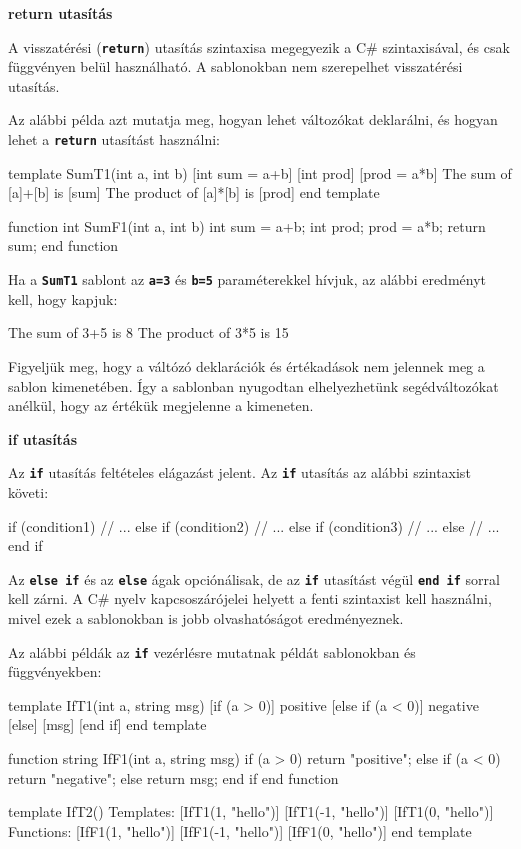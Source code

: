 \documentclass[12pt, a4paper]{report}
\newcommand{\ff}[1]{\textbf{\texttt{#1}}}
\newcommand{\bb}[1]{\textbf{#1}}
\begin{document}
\bb{return utasítás}

A visszatérési (\ff{return}) utasítás szintaxisa megegyezik a C\# szintaxisával, és csak függvényen belül használható. A sablonokban nem szerepelhet visszatérési utasítás.

Az alábbi példa azt mutatja meg, hogyan lehet változókat deklarálni, és hogyan lehet a \ff{return} utasítást használni:

\begin{mgencode}
template SumT1(int a, int b)
  [int sum = a+b]
  [int prod]
  [prod = a*b]
  The sum of [a]+[b] is [sum]
  The product of [a]*[b] is [prod]
end template

function int SumF1(int a, int b)
  int sum = a+b;
  int prod;
  prod = a*b;
  return sum;
end function
\end{mgencode}

Ha a \ff{SumT1} sablont az \ff{a=3} és \ff{b=5} paraméterekkel hívjuk, az alábbi eredményt kell, hogy kapjuk:

\begin{textcode}
  The sum of 3+5 is 8
  The product of 3*5 is 15
\end{textcode}

Figyeljük meg, hogy a váltózó deklarációk és értékadások nem jelennek meg a sablon kimenetében. Így a sablonban nyugodtan elhelyezhetünk segédváltozókat anélkül, hogy az értékük megjelenne a kimeneten.

\bb{if utasítás}

Az \ff{if} utasítás feltételes elágazást jelent. Az \ff{if} utasítás az alábbi szintaxist követi:

\begin{mgencode}
if (condition1)
// ...
else if (condition2)
// ...
else if (condition3)
// ...
else
// ...
end if
\end{mgencode}

Az \ff{else if} és az \ff{else} ágak opciónálisak, de az \ff{if} utasítást végül \ff{end if} sorral kell zárni. A C\# nyelv kapcsoszárójelei helyett a fenti szintaxist kell használni, mivel ezek a sablonokban is jobb olvashatóságot eredményeznek.

Az alábbi példák az \ff{if} vezérlésre mutatnak példát sablonokban és függvényekben:

\begin{mgencode}
template IfT1(int a, string msg)
  [if (a > 0)]
positive
  [else if (a < 0)]
negative
  [else]
[msg]
  [end if]
end template

function string IfF1(int a, string msg)
  if (a > 0)
    return "positive";
  else if (a < 0)
    return "negative";
  else
    return msg;
  end if
end function

template IfT2()
Templates:
  [IfT1(1, "hello")]
  [IfT1(-1, "hello")]
  [IfT1(0, "hello")]
Functions:
  [IfF1(1, "hello")]
  [IfF1(-1, "hello")]
  [IfF1(0, "hello")]
end template
\end{mgencode}
\end{document}
